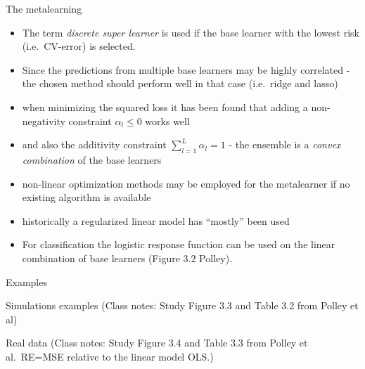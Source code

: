 \documentclass[
  ignorenonframetext,
]{beamer}
\providecommand{\tightlist}{%
  \setlength{\itemsep}{0pt}\setlength{\parskip}{0pt}}
\begin{document}
\begin{frame}
\begin{block}{The metalearning}
\protect\hypertarget{the-metalearning}{}
\begin{itemize}
\tightlist
\item
  The term \emph{discrete super learner} is used if the base learner
  with the lowest risk (i.e.~CV-error) is selected.
\item
  Since the predictions from multiple base learners may be highly
  correlated - the chosen method should perform well in that case
  (i.e.~ridge and lasso)
\item
  when minimizing the squared loss it has been found that adding a
  non-negativity constraint \(\alpha_l\le 0\) works well
\item
  and also the additivity constraint \(\sum_{l=1}^L \alpha_l=1\) - the
  ensemble is a \emph{convex combination} of the base learners
\item
  non-linear optimization methods may be employed for the metalearner if
  no existing algorithm is available
\item
  historically a regularized linear model has ``mostly'' been used
\item
  For classification the logistic response function can be used on the
  linear combination of base learners (Figure 3.2 Polley).
\end{itemize}
\end{block}
\end{frame}

\begin{frame}
\begin{block}{Examples}
\protect\hypertarget{examples}{}
\begin{block}{Simulations examples}
\protect\hypertarget{simulations-examples}{}
(Class notes: Study Figure 3.3 and Table 3.2 from Polley et al)
\end{block}

\begin{block}{Real data}
\protect\hypertarget{real-data}{}
(Class notes: Study Figure 3.4 and Table 3.3 from Polley et al.~RE=MSE
relative to the linear model OLS.)
\end{block}
\end{block}
\end{frame}
\end{document}
